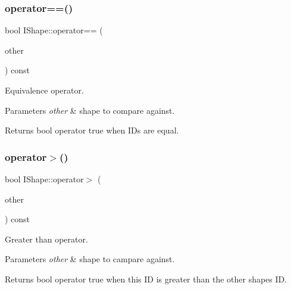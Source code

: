 \subsubsection{\texorpdfstring{operator==()}{operator==()}}
{\footnotesize\ttfamily bool I\+Shape\+::operator== (\begin{DoxyParamCaption}\item[{const \mbox{\hyperlink{class_i_shape}{I\+Shape}} \&}]{other }\end{DoxyParamCaption}) const}



Equivalence operator. 


\begin{DoxyParams}{Parameters}
{\em other} & shape to compare against. \\
\hline
\end{DoxyParams}
\begin{DoxyReturn}{Returns}
bool operator true when I\+Ds are equal. 
\end{DoxyReturn}
\mbox{\label{class_i_shape_a95d2cf58e5264e4e4bf1af65a383760c}} 
\subsubsection{\texorpdfstring{operator$>$()}{operator>()}}
{\footnotesize\ttfamily bool I\+Shape\+::operator$>$ (\begin{DoxyParamCaption}\item[{const \mbox{\hyperlink{class_i_shape}{I\+Shape}} \&}]{other }\end{DoxyParamCaption}) const}



Greater than operator. 


\begin{DoxyParams}{Parameters}
{\em other} & shape to campare against. \\
\hline
\end{DoxyParams}
\begin{DoxyReturn}{Returns}
bool operator true when this ID is greater than the other shape\textquotesingle{}s ID. 
\end{DoxyReturn}
\mbox{\label{class_i_shape_ac05b13d61818afc793cb0387703a0998}} 
